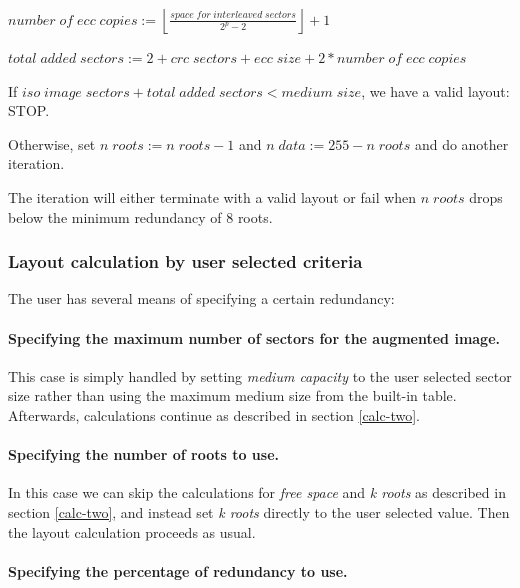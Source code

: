 \smallskip

\quad $number\; of\; ecc\; copies := \left\lfloor\frac{space\; for\; interleaved\; sectors}{2^p - 2}\right\rfloor + 1$

\smallskip

\quad $total\; added\; sectors := 2 + crc\; sectors + ecc\; size + 2 * number\; of\; ecc\; copies$

\medskip

\quad If $iso\; image\; sectors + total\; added\; sectors < medium\; size$,
we have a valid layout: STOP.

\smallskip

\quad Otherwise, set $n\; roots := n\; roots - 1$ and $n\; data := 255 - n\; roots$
and do another iteration. 

\medskip

The iteration will either terminate with a valid layout or fail when
$n\; roots$ drops below the minimum redundancy of 8 roots. 

\subsubsection{Layout calculation by user selected criteria}

The user has several means of specifying a certain redundancy:

\paragraph{Specifying the maximum number of sectors for the augmented image.}

This case is simply handled by setting {\em medium capacity} to the user
selected sector size rather than using the maximum medium size from the
built-in table. Afterwards, calculations continue as described in
section \ref{calc-two}.

\paragraph{Specifying the number of roots to use.}

In this case we can skip the calculations for {\em free space} and
{\em k roots} as described in section \ref{calc-two}, and instead
set {\em k roots} directly to the user selected value. Then the
layout calculation proceeds as usual. 

\paragraph{Specifying the percentage of redundancy to use.}

